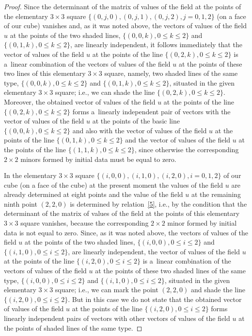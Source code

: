\documentclass[11pt]{article}
\begin{document}
\begin{proof}
Since the determinant of the matrix of values of the f\/ield at the
points of the elementary $3 \times 3$ square $\{(0, j, 0), (0, j,
1), (0, j, 2), j = 0, 1, 2\}$ (on a face of our cube) vanishes and,
as it was noted above, the vectors of values of the f\/ield $u$ at the
points of the two shaded lines, $\{(0, 0, k), 0 \leq k \leq 2\}$ and
$\{(0, 1, k), 0 \leq k \leq 2\}$, are linearly independent, it
follows immediately that the vector of values of the f\/ield $u$ at
the points of the line $\{(0, 2, k), 0 \leq k \leq 2\}$ is a~linear
combination of the vectors of values of the f\/ield $u$ at the points
of these two lines of this elementary $3 \times 3$ square, namely,
two shaded lines of the same type, $\{(0, 0, k), 0 \leq k \leq 2\}$
and $\{(0, 1, k), 0 \leq k \leq 2\}$, situated in the given
elementary $3 \times 3$ square; i.e., we can shade the line $\{(0,
2, k), 0 \leq k \leq 2\}$. Moreover, the obtained vector of values
of the f\/ield $u$ at the points of the line $\{(0, 2, k), 0 \leq k
\leq 2\}$ forms a~linearly independent pair of vectors with the
vector of values of the f\/ield $u$ at the points of the basic line
$\{(0, 0, k), 0 \leq k \leq 2\}$ and also with the vector of values
of the f\/ield $u$ at the points of the line $\{(0, 1, k), 0 \leq k
\leq 2\}$ and the vector of values of the f\/ield $u$ at the points of
the line $\{(1, 1, k), 0 \leq k \leq 2\}$, since otherwise the
corresponding $2 \times 2$ minors formed by initial data must be
equal to zero.



In the elementary $3 \times 3$ square $\{(i, 0, 0), (i, 1, 0), (i,
2, 0), i = 0, 1, 2\}$ of our cube (on a face of the cube) at the
present moment the values of the f\/ield $u$ are already determined at
eight points and the value of the f\/ield $u$ at the remaining ninth
point $(2, 2, 0)$ is determined by relation~\eqref{5}, i.e.,
by the condition that the determinant of the matrix of values of the
f\/ield at the points of this elementary $3 \times 3$ square vanishes,
because the corresponding $2 \times 2$ minor formed by initial data
is not equal to zero. Since, as it was noted above, the vectors of
values of the f\/ield $u$ at the points of the two shaded lines,
$\{(i, 0, 0), 0 \leq i \leq 2\}$ and $\{(i, 1, 0), 0 \leq i \leq
2\}$, are linearly independent, the vector of values of the f\/ield
$u$ at the points of the line $\{(i, 2, 0), 0 \leq i \leq 2\}$ is a~linear combination of the vectors of values of the f\/ield $u$ at the
points of these two shaded lines of the same type, $\{(i, 0, 0), 0
\leq i \leq 2\}$ and $\{(i, 1, 0), 0 \leq i \leq 2\}$, situated in
the given elementary $3 \times 3$ square; i.e., we can mark the
point $(2, 2, 0)$ and shade the line $\{(i, 2, 0), 0 \leq i \leq
2\}$. But in this case we do not state that the obtained vector of
values of the f\/ield $u$ at the points of the line $\{(i, 2, 0), 0
\leq i \leq 2\}$ forms linearly independent pairs of vectors with
other vectors of values of the f\/ield $u$ at the points of shaded
lines of the same type.





\end{proof}
\end{document}
